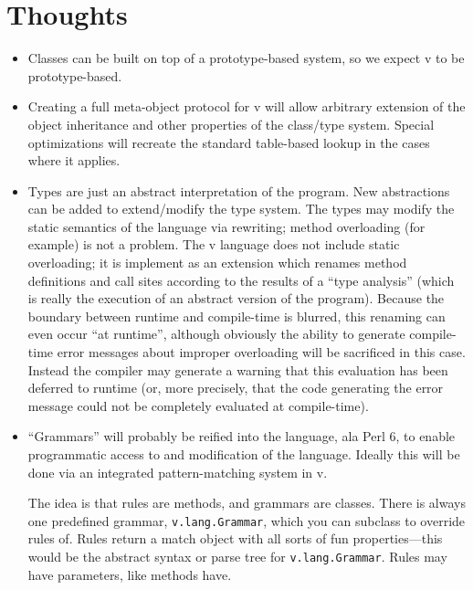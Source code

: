 \documentclass[11pt,notitlepage,twocolumn]{article}
\newcommand{\vlang}{\textsf{v}\xspace}
\begin{document}
\section{Thoughts}
\begin{itemize}
\item Classes can be built on top of a prototype-based system, so we
  expect \vlang to be prototype-based.
\item Creating a full meta-object protocol for \vlang will allow arbitrary
  extension of the object inheritance and other properties of the
  class/type system.  Special optimizations will recreate the standard
  table-based lookup in the cases where it applies.
\item Types are just an abstract interpretation of the program.  New
  abstractions can be added to extend/modify the type system.  The
  types may modify the static semantics of the language via rewriting;
  method overloading (for example) is not a problem.  The \vlang language
  does not include static overloading; it is implement as an extension which
  renames method definitions and call sites according to the results
  of a ``type analysis'' (which is really the execution of an abstract
  version of the program).  Because the boundary between runtime and
  compile-time is blurred, this renaming can even occur ``at
  runtime'', although obviously the ability to generate compile-time
  error messages about improper overloading will be sacrificed in this
  case.  Instead the compiler may generate a warning that this
  evaluation has been deferred to runtime (or, more precisely, that
  the code generating the error message could not be completely
  evaluated at compile-time).
\item ``Grammars'' will probably be reified into the language, ala
  Perl 6, to enable programmatic access to and modification of the
  language.  Ideally this will be done via an integrated
  pattern-matching system in \vlang.

  The idea is that rules are methods, and grammars are classes.  There
  is always one predefined grammar, \texttt{v.lang.Grammar}, which you
  can subclass to override rules of.  Rules return a match object with
  all sorts of fun properties---this would be the abstract syntax or
  parse tree for \texttt{v.lang.Grammar}.  Rules may have parameters,
  like methods have.


\end{itemize}
\end{document}
